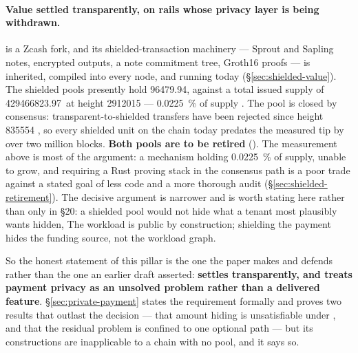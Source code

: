 \paragraph{Value settled transparently, on rails whose privacy layer is being withdrawn.}
\fluxd is a Zcash fork, and its shielded-transaction machinery — Sprout and Sapling notes, encrypted
outputs, a note commitment tree, Groth16 proofs — is inherited, compiled into every node, and running
today \shipped (\S\ref{sec:shielded-value}). The shielded pools presently hold
\num{96479.94}\flux, against a total issued supply of \num{429466823.97}\flux\ at height
\num{2912015} — \SI{0.0225}{\percent} of supply
\shipped {}. The pool is closed by
consensus: transparent-to-shielded transfers have been rejected since height \num{835554}
\shipped {}, so every shielded unit on the chain today predates
the measured tip by over two million blocks. \textbf{Both pools are to be retired}
 (\planned). The measurement above is most of the
argument: a mechanism holding \SI{0.0225}{\percent} of supply, unable to grow, and requiring a Rust
proving stack in the consensus path is a poor trade against a stated goal of less code and a more
thorough audit (\S\ref{sec:shielded-retirement}). The decisive argument is narrower and is worth
stating here rather than only in \S20: a shielded pool would not hide what a tenant most plausibly
wants hidden,  The workload is public by
construction; shielding the payment hides the funding source, not the workload graph.

So the honest statement of this pillar is the one the paper makes and defends rather than the one an
earlier draft asserted: \textbf{\Flux{} settles transparently, and treats payment privacy as an
unsolved problem rather than a delivered feature}. \S\ref{sec:private-payment} states the
requirement formally and proves two results that outlast the decision --- that amount hiding is
unsatisfiable under \PNR{}, and that the residual problem is confined to one optional path --- but
its constructions are inapplicable to a chain with no pool, and it says so.

